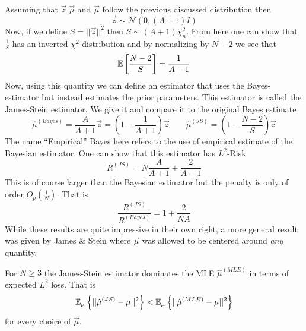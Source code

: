 \documentclass[11pt]{article}
\begin{document}
 Assuming that $\vec{z}|\vec{\mu}$ and $\vec{\mu}$ follow the previous discussed distribution then 
 \begin{equation}
\vec{z}\sim \mathcal{N}(0, (A+1)I)
 \end{equation}
Now, if we define $S = ||\vec{z}||^2$ then $S\sim (A+1)\chi^2_{n}$. From here one can show that $\frac{1}{S}$ has an inverted $\chi^2$ distribution and by normalizing by $N-2$ we see that 
\begin{equation}
{\mathbb{E}}\left[\frac{N-2}{S}\right] = \frac{1}{A+1}
\end{equation}
Now, using this quantity we can define an estimator that uses the Bayes-estimator but instead estimates the prior parameters. This estimator is called the James-Stein estimator. We give it and compare it to the original Bayes estimate 
\begin{equation}
\hat{\mu}^{(Bayes)} = \frac{A}{A+1}\vec{z} = \left(1 - \frac{1}{A+1}\right)\vec{z}\quad\quad \hat{\mu}^{(JS)} = \left(1 - \frac{N-2}{S}\right)\vec{z}
\end{equation}
The name ``Empirical'' Bayes here refers to the use of empirical estimate of the Bayesian estimator. One can show that this estimator has $L^2$-Risk 
\begin{equation}
R^{(JS)} = N\frac{A}{A+1} + \frac{2}{A+1}
\end{equation}
This is of course larger than the Bayesian estimator but the penalty is only of order $O_p(\frac{1}{N})$. That is 
\begin{equation}
\frac{R^{(JS)}}{R^{(Bayes)}} = 1 + \frac{2}{NA}
\end{equation}
While these results are quite impressive in their own right, a more general result was given by James \& Stein where $\vec{\mu}$ was allowed to be centered around \textit{any} quantity. 

\begin{theorem}\label{JS} For $N\geq 3$ the James-Stein estimator dominates the MLE $\hat{\mu}^{(MLE)}$ in terms of expected $L^2$ loss. That is \begin{equation}{\mathbb{E}}_{\mu}\left\{||\hat{\mu}^{(JS)} - \mu||^2\right\}<{\mathbb{E}}_{\mu}\left\{||\hat{\mu}^{(MLE)} - \mu||^2\right\}\end{equation} for every choice of $\vec{\mu}$. 
\end{theorem}
\end{document}
